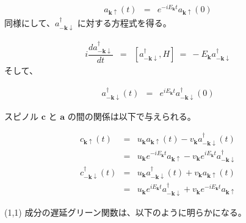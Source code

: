 \documentclass[uplatex,a4j,12pt,dvipdfmx]{jsarticle}
\begin{document}
\begin{eqnarray}
	a_{\bm{k} \uparrow}(t)
	&=&
	e^{ - i E_{\bm{k}} t }
	a_{\bm{k} \uparrow}(0)
\end{eqnarray}
%
同様にして、$a_{-\bm{k} \downarrow}^{\dagger}$ に対する方程式を得る。

\begin{eqnarray}
	i \dfrac{d a_{-\bm{k} \downarrow}^{\dagger} }{dt}
	&=&
	\left[ a_{-\bm{k} \downarrow}^{\dagger} , H \right]
	\ = \
	-
	E_{\bm{k}}
	a_{-\bm{k} \downarrow}^{\dagger}
\end{eqnarray}
%
そして、

\begin{eqnarray}
	a_{-\bm{k} \downarrow}^{\dagger}(t)
	&=&
	e^{ i E_{\bm{k}} t }
	a_{-\bm{k} \downarrow}^{\dagger}(0)
\end{eqnarray}
%

スピノル $\bm{c}$ と $\bm{a}$ の間の関係は以下で与えられる。

\begin{eqnarray}
	c_{\bm{k} \uparrow}(t)
	&=&
	u_{\bm{k}} a_{\bm{k} \uparrow}(t)
	-
	v_{\bm{k}} a_{- \bm{k} \downarrow}^{\dagger}(t)
	\nonumber \\[2mm]
	&=&
	u_{\bm{k}} e^{ - i E_{\bm{k}} t }
	a_{\bm{k} \uparrow}
	-
	v_{\bm{k}} e^{ i E_{\bm{k}} t }
	a_{-\bm{k} \downarrow}^{\dagger}
	\\[5mm]
	c_{- \bm{k} \downarrow}^{\dagger}(t)
	&=&
	u_{\bm{k}} a_{- \bm{k} \downarrow}^{\dagger}(t)
	+
	v_{\bm{k}} a_{\bm{k} \uparrow}(t)
	\nonumber \\[2mm]
	&=&
	u_{\bm{k}} e^{ i E_{\bm{k}} t }
	a_{-\bm{k} \downarrow}^{\dagger}
	+
	v_{\bm{k}} e^{ - i E_{\bm{k}} t }
	a_{\bm{k} \uparrow}
\end{eqnarray}
%

(1,1) 成分の遅延グリーン関数は、以下のように明らかになる。
\end{document}
